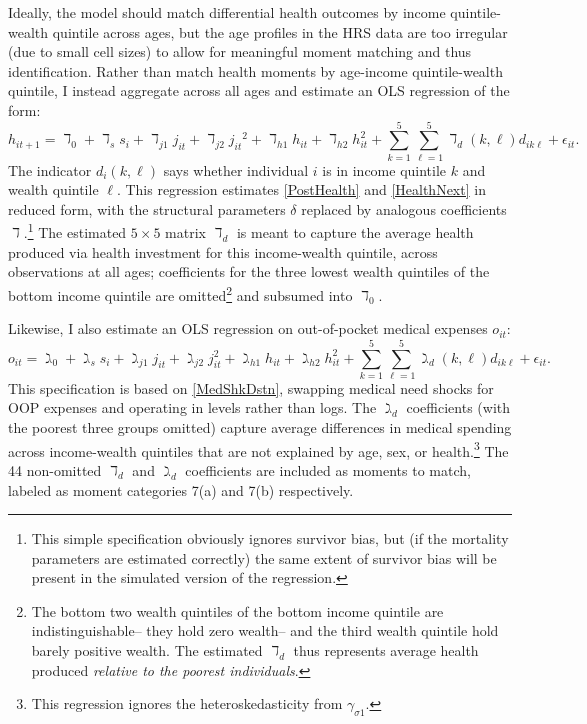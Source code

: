 \documentclass[12pt,pdftex,letterpaper]{article}
\newcommand{\Health}{h}
\newcommand{\MedShkParam}{\gamma}
\newcommand{\MedShkParamAlt}{\gimel}
\newcommand{\OOP}{o}
\newcommand{\HealthParam}{\delta}
\newcommand{\HealthParamAlt}{\daleth}
\newcommand{\Sex}{s}
\begin{document}
Ideally, the model should match differential health outcomes by income quintile-wealth quintile across ages, but the age profiles in the HRS data are too irregular (due to small cell sizes) to allow for meaningful moment matching and thus identification.  Rather than match health moments by age-income quintile-wealth quintile, I instead aggregate across all ages and estimate an OLS regression of the form:
\begin{equation}\label{HealthOLS}
\Health_{it+1} = \HealthParamAlt_0 + \HealthParamAlt_{\Sex} \Sex_i + \HealthParamAlt_{j1} j_{it} + \HealthParamAlt_{j2} {j_{it}}^2 + \HealthParamAlt_{\Health 1} \Health_{it} + \HealthParamAlt_{\Health 2} \Health_{it}^2 + \sum_{k=1}^{5} \sum_{\ell=1}^{5} \HealthParamAlt_{d}(k,\ell) d_{ik\ell} + \epsilon_{it}.
\end{equation}
The indicator $d_{i}(k,\ell)$ says whether individual $i$ is in income quintile $k$ and wealth quintile $\ell$.  This regression estimates \eqref{PostHealth} and \eqref{HealthNext} in reduced form, with the structural parameters $\HealthParam$ replaced by analogous coefficients $\HealthParamAlt$.\footnote{This simple specification obviously ignores survivor bias, but (if the mortality parameters are estimated correctly) the same extent of survivor bias will be present in the simulated version of the regression.}  The estimated $5 \times 5$ matrix $\HealthParamAlt_d$ is meant to capture the average health produced via health investment for this income-wealth quintile, across observations at all ages; coefficients for the three lowest wealth quintiles of the bottom income quintile are omitted\footnote{The bottom two wealth quintiles of the bottom income quintile are indistinguishable-- they hold zero wealth-- and the third wealth quintile hold barely positive wealth.  The estimated $\HealthParamAlt_d$ thus represents average health produced \textit{relative to the poorest individuals}.} and subsumed into $\HealthParamAlt_0$.

Likewise, I also estimate an OLS regression on out-of-pocket medical expenses $\OOP_{it}$:
\begin{equation}\label{OOPOLS}
\OOP_{it} = \MedShkParamAlt_0 + \MedShkParamAlt_{\Sex} \Sex_i + \MedShkParamAlt_{j1} j_{it} + \MedShkParamAlt_{j2} j_{it}^2 + \MedShkParamAlt_{\Health 1} \Health_{it} + \MedShkParamAlt_{\Health 2} \Health_{it}^2 + \sum_{k=1}^{5} \sum_{\ell=1}^{5} \MedShkParamAlt_{d}(k,\ell) d_{ik\ell} + \epsilon_{it}.
\end{equation}
This specification is based on \eqref{MedShkDstn}, swapping medical need shocks for OOP expenses and operating in levels rather than logs.  The $\MedShkParamAlt_d$ coefficients (with the poorest three groups omitted) capture average differences in medical spending across income-wealth quintiles that are not explained by age, sex, or health.\footnote{This regression ignores the heteroskedasticity from $\MedShkParam_{\sigma 1}$.}  The 44 non-omitted $\HealthParamAlt_d$ and $\MedShkParamAlt_d$ coefficients are included as moments to match, labeled as moment categories 7(a) and 7(b) respectively.
\end{document}
